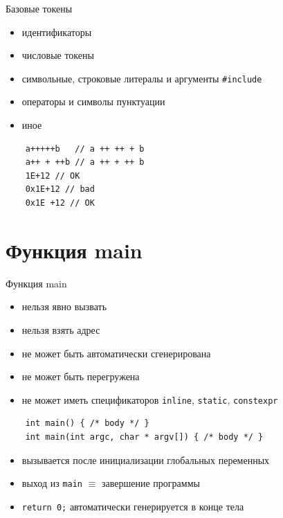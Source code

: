 \documentclass[unknownkeysallowed,xcolor=table]{beamer}
\begin{document}
\begin{frame}[fragile]{Базовые токены}
  \begin{itemize}
    \item идентификаторы
    \item числовые токены
    \item символьные, строковые литералы и аргументы \lstinline{#include}
    \item операторы и символы пунктуации
    \item иное
  \end{itemize}
  \begin{lstlisting}
    a+++++b   // a ++ ++ + b
    a++ + ++b // a ++ + ++ b
    1E+12 // OK
    0x1E+12 // bad
    0x1E +12 // OK
  \end{lstlisting}
\end{frame}

\section{Функция main}

\begin{frame}[fragile]{Функция main}
  \begin{itemize}
    \item нельзя явно вызвать
    \item нельзя взять адрес
    \item не может быть автоматически сгенерирована
    \item не может быть перегружена
    \item не может иметь спецификаторов \lstinline{inline}, \lstinline{static}, \lstinline{constexpr}
  \end{itemize}
  \vspace{1em}
  \begin{lstlisting}
    int main() { /* body */ }
    int main(int argc, char * argv[]) { /* body */ }
  \end{lstlisting}
  \vspace{1em}
  \begin{itemize}
    \item вызывается после инициализации глобальных переменных
    \item выход из \lstinline{main} $\equiv$ завершение программы
    \item \lstinline{return 0;} автоматически генерируется в конце тела
  \end{itemize}
\end{frame}
\end{document}
